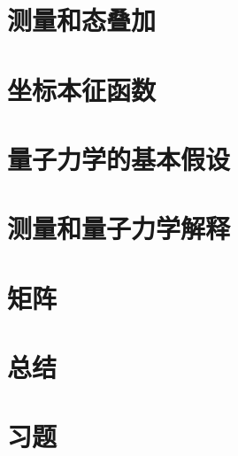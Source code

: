 \section{测量和态叠加}
\label{sec:7.6 Measurement and the Superposition of States}

\section{坐标本征函数}
\label{sec:7.7 Position Eigenfunctions}

\section{量子力学的基本假设}
\label{sec:7.8 The Postulates of Quantum Mechanics}

\section{测量和量子力学解释}
\label{sec:7.9 Measurement and the Interpretation of Quantum Mechanics}

\section{矩阵}
\label{sec:7.10 Matrices}

\section*{总结}

\section*{习题}